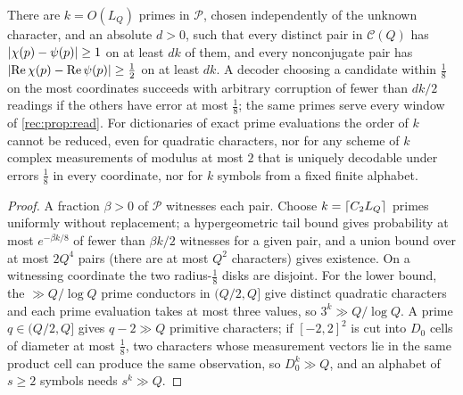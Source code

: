 \begin{corollary}\label{rec:cor:dict}
There are $k=O(L_Q)$ primes in $\mathcal P$, chosen independently of the unknown character, and an
absolute $d>0$, such that every distinct pair in $\mathcal C(Q)$ has $\lvert\chi(p)-\psi(p)\rvert\ge1$ on at least $dk$ of
them, and every nonconjugate pair has $\lvert\operatorname{Re}\chi(p)-\operatorname{Re}\psi(p)\rvert\ge\tfrac12$ on at least $dk$. A decoder
choosing a candidate within $\tfrac18$ on the most coordinates succeeds with arbitrary corruption of
fewer than $dk/2$ readings if the others have error at most $\tfrac18$; the same primes serve every
window of \cref{rec:prop:read}. For dictionaries of exact prime evaluations the order of $k$ cannot be
reduced, even for quadratic characters, nor for any scheme of $k$ complex measurements of modulus at
most $2$ that is uniquely decodable under errors $\tfrac18$ in every coordinate, nor for $k$ symbols from a
fixed finite alphabet.
\end{corollary}

\begin{proof}
A fraction $\beta>0$ of $\mathcal P$ witnesses each pair. Choose $k=\lceil C_2L_Q\rceil$ primes uniformly without
replacement; a hypergeometric tail bound gives probability at most $e^{-\beta k/8}$ of fewer than $\beta k/2$
witnesses for a given pair, and a union bound over at most $2Q^4$ pairs (there are at most $Q^2$
characters) gives existence. On a witnessing coordinate the two radius-$\tfrac18$ disks are disjoint.
For the lower bound, the $\gg Q/\log Q$ prime conductors in $(Q/2,Q]$ give distinct quadratic characters
and each prime evaluation takes at most three values, so $3^k\gg Q/\log Q$. A prime $q\in(Q/2,Q]$ gives
$q-2\gg Q$ primitive characters; if $[-2,2]^2$ is cut into $D_0$ cells of diameter at most $\tfrac18$, two
characters whose measurement vectors lie in the same product cell can produce the same observation,
so $D_0^k\gg Q$, and an alphabet of $s\ge2$ symbols needs $s^k\gg Q$.
\end{proof}

